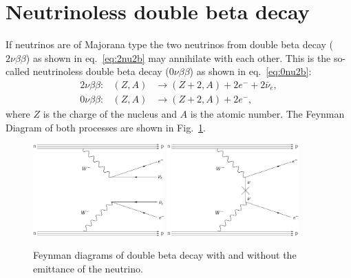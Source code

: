 \section{Neutrinoless double beta decay}
\label{sec:0n2b}
If neutrinos are of Majorana type the two neutrinos from double beta decay ($2\nu\beta\beta$) as shown in eq.~\ref{eq:2nu2b} may annihilate with each other. This is the so-called neutrinoless double beta decay ($0\nu\beta\beta$) as shown in eq.~\ref{eq:0nu2b}:
\begin{eqnarray}
  2\nu\beta\beta: &(Z,A)& \rightarrow (Z+2,A) + 2e^{-} + 2\bar{\nu}_{e}, \\\label{eq:2nu2b}
  0\nu\beta\beta: &(Z,A)& \rightarrow (Z+2,A) + 2e^{-}, \label{eq:0nu2b}
\end{eqnarray}
where $Z$ is the charge of the nucleus and $A$ is the atomic number. The Feynman Diagram of both processes are shown in Fig.~\ref{fig:2bdecay}.
\begin{figure}[tbhp]
  \centering
  \includegraphics[width=0.45\textwidth]{FD2nu2b.eps} \hfil
  \includegraphics[width=0.45\textwidth]{FD0nu2b.eps}  
  \caption{Feynman diagrams of double beta decay with and without the         emittance of the neutrino.}
  \label{fig:2bdecay}
\end{figure}

